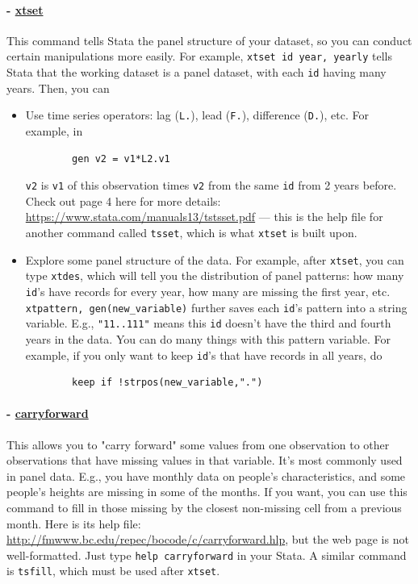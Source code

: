 \paragraph{- \underline{xtset}} This command tells Stata the panel structure of your dataset, so you can conduct certain manipulations more easily. For example, \verb|xtset id year, yearly| tells Stata that the working dataset is a panel dataset, with each \verb|id| having many years. Then, you can 
\begin{itemize}
    \item Use time series operators: lag (\verb|L.|), lead (\verb|F.|), difference (\verb|D.|), etc. For example, in 
    \begin{verbatim}
        gen v2 = v1*L2.v1
    \end{verbatim}
    \verb|v2| is \verb|v1| of this observation times \verb|v2| from the same \verb|id| from 2 years before. Check out page 4 here for more details: \url{https://www.stata.com/manuals13/tstsset.pdf} --- this is the help file for another command called \verb|tsset|, which is what \verb|xtset| is built upon. 
    \item Explore some panel structure of the data. For example, after \verb|xtset|, you can type \verb|xtdes|, which will tell you the distribution of panel patterns: how many \verb|id|'s have records for every year, how many are missing the first year, etc. \verb|xtpattern, gen(new_variable)| further saves each \verb|id|'s pattern into a string variable. E.g., \verb|"11..111"| means this \verb|id| doesn't have the third and fourth years in the data. You can do many things with this pattern variable. For example, if you only want to keep \verb|id|'s that have records in all years, do 
    \begin{verbatim}
        keep if !strpos(new_variable,".")
    \end{verbatim}
\end{itemize}

\paragraph{- \underline{carryforward}} This allows you to "carry forward" some values from one observation to other observations that have missing values in that variable. It's most commonly used in panel data. E.g., you have monthly data on people's characteristics, and some people's heights are missing in some of the months. If you want, you can use this command to fill in those missing by the closest non-missing cell from a previous month. Here is its help file: \url{http://fmwww.bc.edu/repec/bocode/c/carryforward.hlp}, but the web page is not well-formatted. Just type \verb|help carryforward| in your Stata. A similar command is \verb|tsfill|, which must be used after \verb|xtset|.

